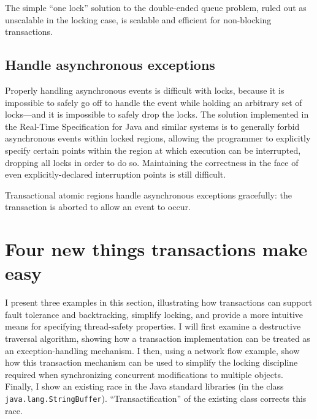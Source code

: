 The simple ``one lock'' solution to the double-ended queue
problem, ruled out as unscalable in the locking case, is scalable and
efficient for non-blocking transactions.

\subsection{Handle asynchronous exceptions}
Properly handling asynchronous events is difficult with locks, because
it is impossible to safely go off to handle the event while holding an
arbitrary set of locks---and it is impossible to safely drop the
locks.  The solution implemented in the Real-Time Specification for
Java and similar systems is to generally forbid asynchronous events within
locked regions, allowing the programmer to explicitly specify certain
points within the region at which execution can be interrupted,
dropping all locks in order to do so.  Maintaining the correctness
in the face of even explicitly-declared interruption points is still
difficult.

Transactional atomic regions handle asynchronous exceptions
gracefully: the transaction is aborted to allow an
event to occur.

\section{Four new things transactions make easy}

I present three examples in this section, illustrating how
transactions can support fault tolerance and backtracking,
simplify locking, and provide a more intuitive
means for specifying thread-safety properties.
I will first examine a destructive traversal algorithm, showing how a
transaction implementation can be treated as an exception-handling
mechanism.   I then, using a network flow example, show how this
transaction mechanism can be used to simplify
the locking discipline required when synchronizing concurrent
modifications to multiple objects.
Finally, I show an existing race in the Java standard libraries (in 
the class \texttt{java.lang.StringBuffer}).  ``Transactification'' of
the existing class corrects this race.

